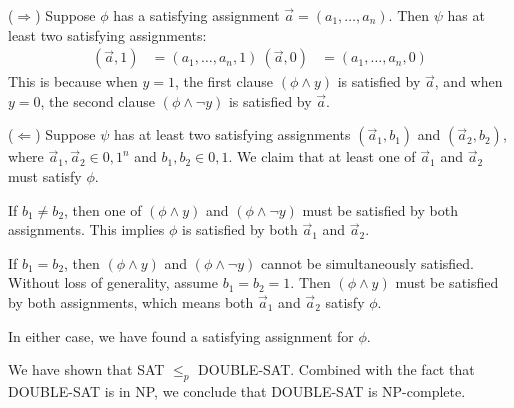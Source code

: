 \documentclass{article}
\begin{document}
($\Rightarrow$) Suppose $\phi$ has a satisfying assignment $\vec{a} = (a_1,\ldots,a_n)$. Then $\psi$ has at least two satisfying assignments:
\begin{align*}
(\vec{a}, 1) &= (a_1,\ldots,a_n, 1) \
(\vec{a}, 0) &= (a_1,\ldots,a_n, 0)
\end{align*}
This is because when $y=1$, the first clause $(\phi \wedge y)$ is satisfied by $\vec{a}$, and when $y=0$, the second clause $(\phi \wedge \neg y)$ is satisfied by $\vec{a}$.

($\Leftarrow$) Suppose $\psi$ has at least two satisfying assignments $(\vec{a}_1, b_1)$ and $(\vec{a}_2, b_2)$, where $\vec{a}_1, \vec{a}_2 \in {0,1}^n$ and $b_1, b_2 \in {0,1}$. We claim that at least one of $\vec{a}_1$ and $\vec{a}_2$ must satisfy $\phi$.

If $b_1 \neq b_2$, then one of $(\phi \wedge y)$ and $(\phi \wedge \neg y)$ must be satisfied by both assignments. This implies $\phi$ is satisfied by both $\vec{a}_1$ and $\vec{a}_2$.

If $b_1 = b_2$, then $(\phi \wedge y)$ and $(\phi \wedge \neg y)$ cannot be simultaneously satisfied. Without loss of generality, assume $b_1 = b_2 = 1$. Then $(\phi \wedge y)$ must be satisfied by both assignments, which means both $\vec{a}_1$ and $\vec{a}_2$ satisfy $\phi$.

In either case, we have found a satisfying assignment for $\phi$.

We have shown that SAT $\leq_p$ DOUBLE-SAT. Combined with the fact that DOUBLE-SAT is in NP, we conclude that DOUBLE-SAT is NP-complete.
\end{document}
